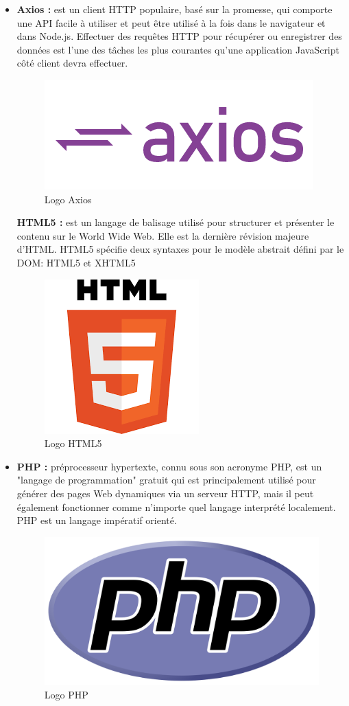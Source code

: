 \begin{itemize}
	\item \textbf{Axios\cite{axios} :} est un client HTTP populaire, basé sur la promesse, qui comporte une API facile à utiliser et peut être utilisé à la fois dans le navigateur et dans Node.js. Effectuer des requêtes HTTP pour récupérer ou enregistrer des données est l'une des tâches les plus courantes qu'une application JavaScript côté client devra effectuer.
	\begin{figure}[H]
		\centering
		\includegraphics[width=0.3\linewidth]{img/logos/axios}
		\caption[Logo Axios]{Logo Axios}
		\label{fig:axios}
	\end{figure}
	
	\textbf{HTML5\cite{html} :} est un langage de balisage utilisé pour structurer et présenter le contenu sur le World Wide Web. Elle est la dernière révision majeure d'HTML. HTML5 spécifie deux syntaxes pour le modèle abstrait défini par le DOM: HTML5 et XHTML5
	\begin{figure}[H]
		\centering
		\includegraphics[width=0.2\linewidth]{img/logos/html5}
		\caption[Logo HTML5]{Logo HTML5}
		\label{fig:html5}
	\end{figure}
	
	\item \textbf{PHP\cite{php} :} préprocesseur hypertexte, connu sous son acronyme PHP, est un "langage de programmation" gratuit qui est principalement utilisé pour générer des pages Web dynamiques via un serveur HTTP, mais il peut également fonctionner comme n'importe quel langage interprété localement. PHP est un langage impératif orienté.
	\begin{figure}[H]
		\centering
		\includegraphics[width=0.2\linewidth]{img/logos/php}
		\caption[Logo PHP]{Logo PHP}
		\label{fig:php}
	\end{figure}
	

\end{itemize}
